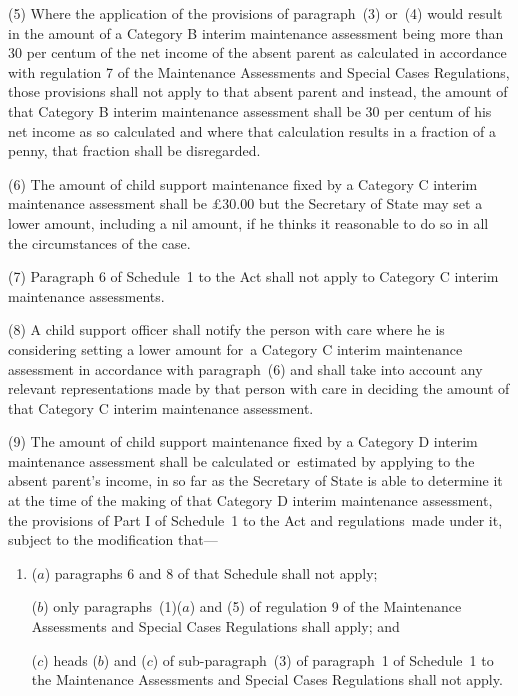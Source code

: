 \documentclass[a4paper,12pt]{article}
\begin{document}
(5) Where the application of the provisions of paragraph~(3) or~(4) would result in the amount of a Category B interim maintenance assessment being more than 30 per centum of the net income of the absent parent as calculated in accordance with regulation 7 of the Maintenance Assessments and Special Cases Regulations, those provisions shall not apply to that absent parent and instead, the amount of that Category B interim maintenance assessment shall be 30 per centum of his net income as so calculated and where that calculation results in a fraction of a penny, that fraction shall be disregarded.

(6) The amount of child support maintenance fixed by a Category C interim maintenance assessment shall be £30$.$00 but 
the Secretary of State  %
may set a lower amount, including a nil amount, if he thinks it reasonable to do so in all the circumstances of the case.

(7) Paragraph 6 of Schedule~1 to the Act shall not apply to Category C interim maintenance assessments.

(8) A child support officer shall notify the person with care where he is considering setting a lower amount for~a Category C interim maintenance assessment in accordance with paragraph~(6) and shall take into account any relevant representations made by that person with care in deciding the amount of that Category C interim maintenance assessment.

(9) The amount of child support maintenance fixed by a Category D interim maintenance assessment shall be calculated or~estimated by applying to the absent parent’s income, in so far as 
the Secretary of State  %
is able to determine it at the time of the making of that Category D interim maintenance assessment, the provisions of Part I of Schedule~1 to the Act and regulations~made under it, subject to the modification that—
\begin{enumerate}\item[]
($a$) paragraphs 6 and 8 of that Schedule shall not apply;

($b$) only paragraphs~(1)($a$) and (5) of regulation 9 of the Maintenance Assessments and Special Cases Regulations shall apply; and

($c$) heads ($b$) and ($c$) of sub-paragraph~(3) of paragraph~1 of Schedule~1 to the Maintenance Assessments and Special Cases Regulations shall not apply.
\end{enumerate}
\end{document}

